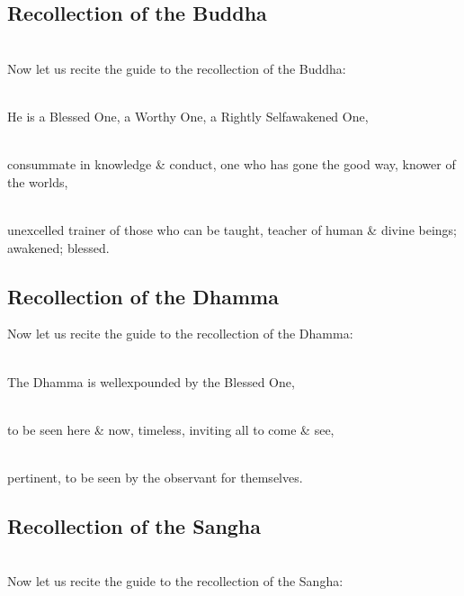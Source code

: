 \documentclass[letterpaper,10pt,english]{sphinxmanual}
\begin{document}
\subsection{Recollection of the Buddha}
\label{\detokenize{chanting:recollection-of-the-buddha}}
\sphinxAtStartPar
{} \\
Now let us recite the guide to the recollection of the Buddha:

\sphinxAtStartPar
{} \\
He is a Blessed One, a Worthy One, a Rightly Self\sphinxhyphen{}awakened One,

\sphinxAtStartPar
{} \\
consummate in knowledge \& conduct, one who has gone the good way, knower of the worlds,

\sphinxAtStartPar
{} \\
unexcelled trainer of those who can be taught, teacher of human \& divine beings; awakened; blessed.


\subsection{Recollection of the Dhamma}
\label{\detokenize{chanting:recollection-of-the-dhamma}}
\sphinxAtStartPar
{}
Now let us recite the guide to the recollection of the Dhamma:

\sphinxAtStartPar
{} \\
The Dhamma is well\sphinxhyphen{}expounded by the Blessed One,

\sphinxAtStartPar
{} \\
to be seen here \& now, timeless, inviting all to come \& see,

\sphinxAtStartPar
{} \\
pertinent, to be seen by the observant for themselves.


\subsection{Recollection of the Sangha}
\label{\detokenize{chanting:recollection-of-the-sangha}}
\sphinxAtStartPar
{}  \\
Now let us recite the guide to the recollection of the Sangha:
\end{document}
